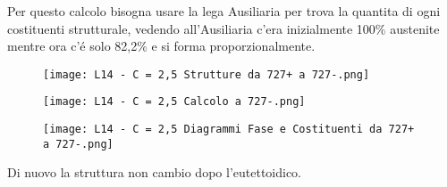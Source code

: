 \documentclass{article}
\begin{document}
{            \newpage
            Per questo calcolo bisogna usare la lega Ausiliaria per trova la quantita di ogni costituenti strutturale, vedendo all'Ausiliaria c'era inizialmente 100$\%$ austenite mentre ora c'\'e solo 82,2$\%$ e si forma proporzionalmente. \\
            \begin{figure}[h!]
                \centering
                \texttt{[image: L14 - C = 2,5 Strutture da 727+ a 727-.png]}
            \end{figure}
            \begin{figure}[h!]
                \centering
                \texttt{[image: L14 - C = 2,5 Calcolo a 727-.png]}
            \end{figure}
            \begin{figure}[h!]
                \centering
                \texttt{[image: L14 - C = 2,5 Diagrammi Fase e Costituenti da 727+ a 727-.png]}
            \end{figure}
            \newpage
            Di nuovo la struttura non cambio dopo l'eutettoidico.\\
}
\end{document}

